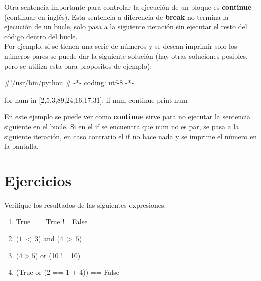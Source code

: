 Otra sentencia importante para controlar la ejecución de un bloque es \textbf{continue} (continuar en inglés). Esta sentencia a diferencia de \textbf{break} no termina la ejecución de un bucle, solo pasa a la siguiente iteración sin ejecutar el resto del código dentro del bucle.\\

Por ejemplo, si se tienen una serie de números y se desean imprimir solo los números pares se puede dar la siguiente solución (hay otras soluciones posibles, pero se utiliza esta para propositos de ejemplo):\\

\begin{pyglist} [language=python]
#!/usr/bin/python
# -*- coding: utf-8 -*-

for num in [2,5,3,89,24,16,17,31]:
    if num %
        continue
    print num
\end{pyglist}

En este ejemplo se puede ver como \textbf{continue} sirve para no ejecutar la sentencia siguiente en el bucle. Si en el if se encuentra que num no es par, se pasa a la siguiente iteración, en caso contrario el if no hace nada y se imprime el número en la pantalla.


\section{Ejercicios}

Verifique los resultados de las siguientes expresiones:

\begin{enumerate}
\item True == True != False
\item ($1 \ < \ 3$) and ($4 \ > \ 5$)   
\item ($4 > 5$) or (10 != 10)
\item (True or (2 == 1 + 4)) == False
\end{enumerate}

